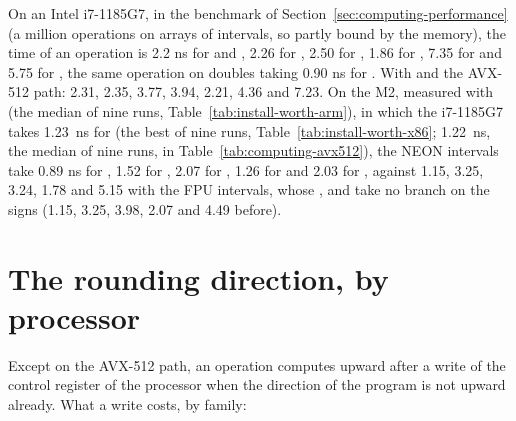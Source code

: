 \medskip
\noindent On an Intel i7-1185G7, in the benchmark of
Section~\ref{sec:computing-performance} (a million operations on arrays of
intervals, so partly bound by the memory), the time of an operation is 2.2 ns
for \code{+} and \code{-}, 2.26 for \code{*}, 2.50 for \code{/}, 1.86 for , 7.35 for  and 5.75 for , the same operation on doubles taking 0.90 ns for \code{+}. With  and the AVX-512 path: 2.31, 2.35, 3.77, 3.94, 2.21, 4.36 and 7.23. On the M2, measured with  (the median of nine runs, Table~\ref{tab:install-worth-arm}), in which the i7-1185G7 takes 1.23~ns for  (the best of nine runs,
Table~\ref{tab:install-worth-x86}; 1.22~ns, the median of nine runs, in
Table~\ref{tab:computing-avx512}), the NEON intervals take 0.89 ns for \code{+}, 1.52 for \code{*}, 2.07 for \code{/}, 1.26 for  and 2.03 for , against 1.15, 3.25, 3.24, 1.78 and 5.15 with the FPU intervals, whose \code{*}, \code{/} and  take no branch on the
signs (1.15, 3.25, 3.98, 2.07 and 4.49 before).

\section{The rounding direction, by processor}
\label{sec:rounding-by-processor}
%

Except on the AVX-512 path, an operation computes upward after a write of
the control register of the processor when the direction of the program is
not upward already. What a write costs, by family:

